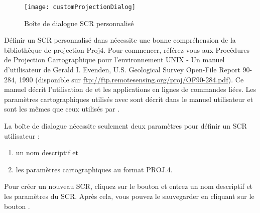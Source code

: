 \begin{figure}[ht]
   \begin{center}
   \texttt{[image: customProjectionDialog]}
   \caption{Boîte de dialogue SCR  personnalisé\nixcaption} \label{fig:customprojections}
\end{center}  
\end{figure}

Définir un SCR personnalisé dans \qg nécessite une bonne
compréhension de la bibliothèque de projection Proj4. Pour commencer, référez
vous aux Procédures de Projection Cartographique pour l'environnement UNIX - Un
manuel d'utilisateur de Gerald I. Evenden, U.S. Geological Survey Open-File
Report 90-284, 1990 (disponible sur
\url{ftp://ftp.remotesensing.org/proj/OF90-284.pdf}).
Ce manuel décrit l'utilisation de  et les applications en
lignes de commandes liées. Les paramètres cartographiques utilisés avec
 sont décrit dans le manuel utilisateur et sont les mêmes que
ceux utilisés par \qg.

La boîte de dialogue  nécessite seulement deux paramètres pour définir un 
SCR utilisateur :
\begin{enumerate}
\item un nom descriptif et
\item les paramètres cartographiques au format PROJ.4.
\end{enumerate}
Pour créer un nouveau SCR, cliquez sur le bouton  
et entrez un nom descriptif et les paramètres du SCR. Après cela, vous pouvez 
le sauvegarder en cliquant sur le bouton .

